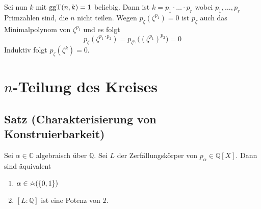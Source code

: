 \bigskip Sei nun $k$ mit $\operatorname{ggT}(n,k)=1$ beliebig. Dann ist $k=p_1 \cdot \ldots  \cdot p_r$ wobei $p_1, \ldots , p_r$ Primzahlen sind, die $n$ nicht teilen. Wegen
$p_\zeta(\zeta^{p_1}) =0$ ist $p_\zeta$  auch das Minimalpolynom von $\zeta^{p_1}$ und es folgt
\[
	p_\zeta ( \zeta^{p_1 \cdot p_2}) = p_{\zeta^{p_1}} \Big( (\zeta^{p_1})^{p_2}\Big) = 0
\]
Induktiv folgt $p_\zeta (\zeta^k) =0$. \bewende
\newpage

\section{$n$-Teilung des Kreises} %
\label{sec:20}

\subsection{Satz (Charakterisierung von Konstruierbarkeit)} %
\label{sub:201}
Sei $\alpha \in \mathds{C}$ algebraisch über $\mathds{Q}$. Sei $L$ der Zerfällungskörper von $p_\alpha \in \mathds{Q}[X]$. Dann sind äquivalent
	\begin{enumerate}[1)]
		\item $\alpha \in \zirkel (\{0,1\})$
		\item $[L:\mathds{Q}]$ ist eine Potenz von $2$. 
	\end{enumerate}

